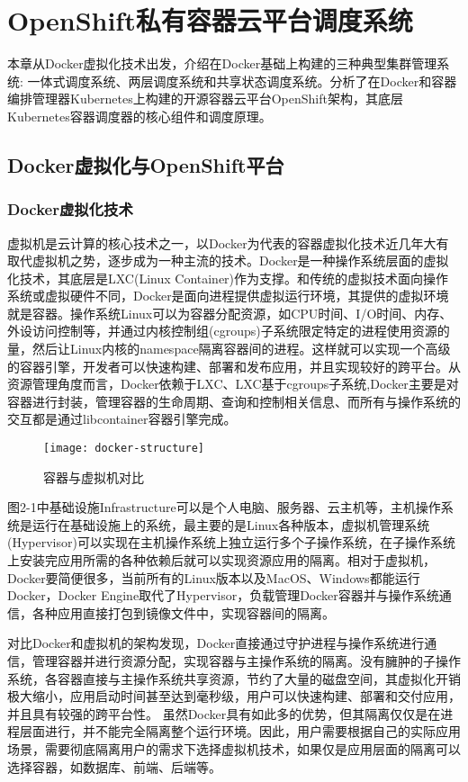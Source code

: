 \chapter{OpenShift私有容器云平台调度系统}
\label{cha:intro}
本章从Docker虚拟化技术出发，介绍在Docker基础上构建的三种典型集群管理系统: 一体式调度系统、两层调度系统和共享状态调度系统。分析了在Docker和容器编排管理器Kubernetes上构建的开源容器云平台OpenShift架构，其底层Kubernetes容器调度器的核心组件和调度原理。

\section{Docker虚拟化与OpenShift平台}
\label{sec:first}
\subsection{Docker虚拟化技术}
虚拟机是云计算的核心技术之一，以Docker为代表的容器虚拟化技术近几年大有取代虚拟机之势，逐步成为一种主流的技术。Docker是一种操作系统层面的虚拟化技术，其底层是LXC(Linux Container)作为支撑。和传统的虚拟技术面向操作系统或虚拟硬件不同，Docker是面向进程提供虚拟运行环境，其提供的虚拟环境就是容器。操作系统Linux可以为容器分配资源，如CPU时间、I/O时间、内存、外设访问控制等，并通过内核控制组(cgroups)子系统限定特定的进程使用资源的量，然后让Linux内核的namespace隔离容器间的进程。这样就可以实现一个高级的容器引擎，开发者可以快速构建、部署和发布应用，并且实现较好的跨平台。从资源管理角度而言，Docker依赖于LXC、LXC基于cgroups子系统,Docker主要是对容器进行封装，管理容器的生命周期、查询和控制相关信息、而所有与操作系统的交互都是通过libcontainer容器引擎完成。
\begin{figure}[H] %
	\centering
	\texttt{[image: docker-structure]}
	\caption{容器与虚拟机对比}
\end{figure}
图2-1中基础设施Infrastructure可以是个人电脑、服务器、云主机等，主机操作系统是运行在基础设施上的系统，最主要的是Linux各种版本，虚拟机管理系统(Hypervisor)可以实现在主机操作系统上独立运行多个子操作系统，在子操作系统上安装完应用所需的各种依赖后就可以实现资源应用的隔离。相对于虚拟机，Docker要简便很多，当前所有的Linux版本以及MacOS、Windows都能运行Docker，Docker Engine取代了Hypervisor，负载管理Docker容器并与操作系统通信，各种应用直接打包到镜像文件中，实现容器间的隔离。

对比Docker和虚拟机的架构发现，Docker直接通过守护进程与操作系统进行通信，管理容器并进行资源分配，实现容器与主操作系统的隔离。没有臃肿的子操作系统，各容器直接与主操作系统共享资源，节约了大量的磁盘空间，其虚拟化开销极大缩小，应用启动时间甚至达到毫秒级，用户可以快速构建、部署和交付应用，并且具有较强的跨平台性。
虽然Docker具有如此多的优势，但其隔离仅仅是在进程层面进行，并不能完全隔离整个运行环境。因此，用户需要根据自己的实际应用场景，需要彻底隔离用户的需求下选择虚拟机技术，如果仅是应用层面的隔离可以选择容器，如数据库、前端、后端等。

